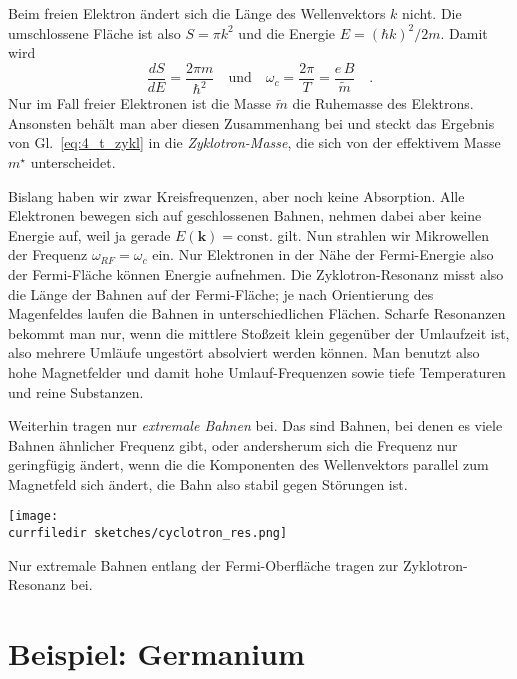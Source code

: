 Beim freien Elektron ändert sich die Länge des Wellenvektors $k$ nicht. Die umschlossene Fläche ist also $S = \pi k^2$ und die Energie $E = (\hbar k)^2 / 2m$. Damit wird 
\begin{equation}
   \frac{dS}{dE} = \frac{2 \pi m}{\hbar^2} \quad \text{und} \quad  \omega_c = \frac{2\pi}{T} =  \frac{e \, B }{\tilde{m}}  \quad .
 \end{equation}
Nur im Fall freier Elektronen ist die Masse $\tilde{m}$ die Ruhemasse des Elektrons. Ansonsten behält man aber diesen Zusammenhang bei und steckt das Ergebnis von Gl.~\ref{eq:4_t_zykl} in die 
 \emph{Zyklotron-Masse}, die sich von der effektivem Masse $m^\star$ unterscheidet.

Bislang haben wir zwar Kreisfrequenzen, aber noch keine Absorption. Alle Elektronen bewegen sich auf geschlossenen Bahnen, nehmen dabei aber keine Energie auf, weil ja gerade $E (\mathbf{k}) = \text{const.}$ gilt. Nun strahlen wir Mikrowellen der Frequenz $\omega_{RF} = \omega_c$ ein. Nur Elektronen in der Nähe der Fermi-Energie also der Fermi-Fläche können Energie aufnehmen. Die Zyklotron-Resonanz misst also die Länge der Bahnen auf der Fermi-Fläche; je nach Orientierung des Magenfeldes laufen die Bahnen in unterschiedlichen Flächen. Scharfe Resonanzen bekommt man nur, wenn die mittlere Stoßzeit klein gegenüber der Umlaufzeit ist, also mehrere Umläufe ungestört absolviert werden können. Man benutzt also hohe Magnetfelder und damit hohe Umlauf-Frequenzen sowie tiefe Temperaturen und reine Substanzen.

Weiterhin tragen nur \emph{extremale Bahnen} bei. Das sind Bahnen, bei denen es viele Bahnen ähnlicher Frequenz gibt,
oder andersherum sich die Frequenz nur geringfügig ändert, wenn die die Komponenten des Wellenvektors parallel zum Magnetfeld sich ändert, die Bahn also stabil gegen Störungen ist. 

\begin{marginfigure}
   \texttt{[image: \\currfiledir sketches/cyclotron\_res.png]}
   \caption{Nur extremale Bahnen entlang der Fermi-Oberfläche tragen zur Zyklotron-Resonanz bei.}
\end{marginfigure}


\section{Beispiel: Germanium}


